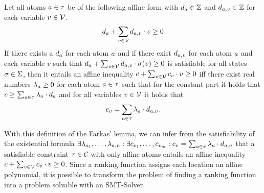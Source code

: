 \begin{definition}
  Let all atoms $a \in \tau$ be of the following affine form with $d_a \in \mathbb{Z}$ and $d_{a,v} \in \mathbb{Z}$ for each variable $v \in \mathcal{V}$.
  \[ d_a + \sum_{v \in \mathcal{V}} d_{a,v} \cdot v \geq 0 \]
  If there exists a $d_a$ for each atom $a$ and if there exist $d_{a,v}$ for each atom $a$ and each variable $v$ such that $d_a + \sum_{v \in \mathcal{V}} d_{a,v} \cdot \sigma(v) \geq 0$ is satisfiable for all states $\sigma \in \Sigma$, then it entails an affine inequality $c + \sum_{v \in \mathcal{V}} c_v \cdot v \geq 0$ iff there exist real numbers $\lambda_a \geq 0$ for each atom $a \in \tau$ such that for the constant part it holds that $c \geq \sum_{a \in \tau} \lambda_a \cdot d_a$ and for all variables $v \in \mathcal{V}$ it holds that
  \[ c_v = \sum_{a \in \tau} \lambda_a \cdot d_{a,v}. \]
\end{definition}
With this definition of the Farkas' lemma, we can infer from the satisfiability of the existential formula $\exists \lambda_{a_1}, \dots, \lambda_{a,n}: \exists c_{v_1}, \dots, c_{v_m}: c_v = \sum_{a \in \tau} \lambda_a \cdot d_{a,v}$ that a satisfiable constraint $\tau \in \mathcal{C}$ with only affine atoms entails an affine inequality $c + \sum_{v \in \mathcal{V}} c_v \cdot v \geq 0$.
Since a ranking function assigns each location an affine polynomial, it is possible to transform the problem of finding a ranking function into a problem solvable with an SMT-Solver.

